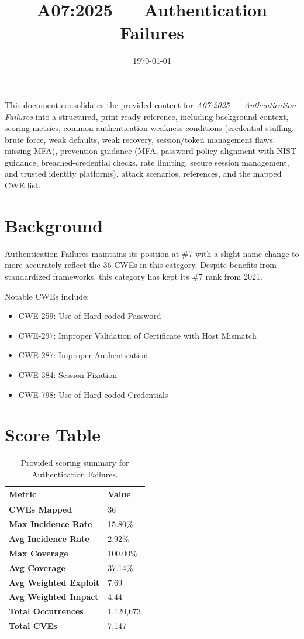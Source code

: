 \documentclass[11pt]{article}
\title{\textbf{A07:2025 — Authentication Failures}}
\date{\today}
\author{} %
\begin{document}
\maketitle

\begin{infobox}
This document consolidates the provided content for \textit{A07:2025 — Authentication Failures} into a structured, print-ready reference, including background context, scoring metrics, common authentication weakness conditions (credential stuffing, brute force, weak defaults, weak recovery, session/token management flaws, missing MFA), prevention guidance (MFA, password policy alignment with NIST guidance, breached-credential checks, rate limiting, secure session management, and trusted identity platforms), attack scenarios, references, and the mapped CWE list.
\end{infobox}

\tableofcontents
\newpage

\section{Background}
Authentication Failures maintains its position at \#7 with a slight name change to more accurately reflect the 36 CWEs in this category. Despite benefits from standardized frameworks, this category has kept its \#7 rank from 2021.

Notable CWEs include:
\begin{itemize}
  \item CWE-259: Use of Hard-coded Password
  \item CWE-297: Improper Validation of Certificate with Host Mismatch
  \item CWE-287: Improper Authentication
  \item CWE-384: Session Fixation
  \item CWE-798: Use of Hard-coded Credentials
\end{itemize}

\section{Score Table}
\begin{table}[h!]
\centering
\renewcommand{\arraystretch}{1.2}
\begin{tabular}{@{}>{\bfseries}p{4.9cm}p{3.1cm}@{}}
\toprule
Metric & Value \\
\midrule
CWEs Mapped & 36 \\
Max Incidence Rate & 15.80\% \\
Avg Incidence Rate & 2.92\% \\
Max Coverage & 100.00\% \\
Avg Coverage & 37.14\% \\
Avg Weighted Exploit & 7.69 \\
Avg Weighted Impact & 4.44 \\
Total Occurrences & 1{,}120{,}673 \\
Total CVEs & 7{,}147 \\
\bottomrule
\end{tabular}
\caption{Provided scoring summary for Authentication Failures.}
\end{table}
\end{document}
